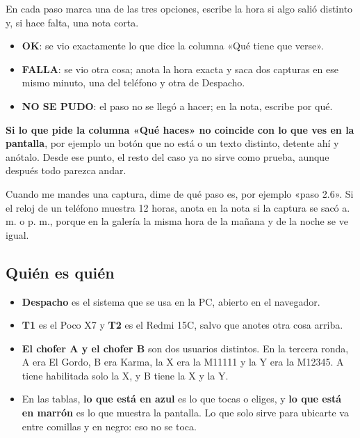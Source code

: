 \documentclass[10pt,a4paper]{article}
\newcommand{\toca}[1]{\textcolor{azul}{\textbf{#1}}}
\newcommand{\pantalla}[1]{\textcolor{marron}{\textbf{#1}}}
\begin{document}
\begin{Form}
En cada paso marca una de las tres opciones, escribe la hora si algo salió distinto y, si hace falta, una nota corta.

\begin{itemize}
  \item \textbf{OK}: se vio exactamente lo que dice la columna «Qué tiene que verse».
  \item \textbf{FALLA}: se vio otra cosa; anota la hora exacta y saca dos capturas en ese mismo minuto, una del teléfono y otra de Despacho.
  \item \textbf{NO SE PUDO}: el paso no se llegó a hacer; en la nota, escribe por qué.
\end{itemize}

\begin{alto}
\textbf{Si lo que pide la columna «Qué haces» no coincide con lo que ves en la pantalla}, por ejemplo un botón que no está o un texto distinto, detente ahí y anótalo. Desde ese punto, el resto del caso ya no sirve como prueba, aunque después todo parezca andar.
\end{alto}

Cuando me mandes una captura, dime de qué paso es, por ejemplo «paso 2.6». Si el reloj de un teléfono muestra 12 horas, anota en la nota si la captura se sacó a. m. o p. m., porque en la galería la misma hora de la mañana y de la noche se ve igual.

\subsection{Quién es quién}

\begin{itemize}
  \item \textbf{Despacho} es el sistema que se usa en la PC, abierto en el navegador.
  \item \textbf{T1} es el Poco X7 y \textbf{T2} es el Redmi 15C, salvo que anotes otra cosa arriba.
  \item \textbf{El chofer A y el chofer B} son dos usuarios distintos. En la tercera ronda, A era El Gordo, B era Karma, la X era la M11111 y la Y era la M12345. A tiene habilitada solo la X, y B tiene la X y la Y.
  \item En las tablas, \toca{lo que está en azul} es lo que tocas o eliges, y \pantalla{lo que está en marrón} es lo que muestra la pantalla. Lo que solo sirve para ubicarte va entre comillas y en negro: eso no se toca.
\end{itemize}


\end{Form}
\end{document}
